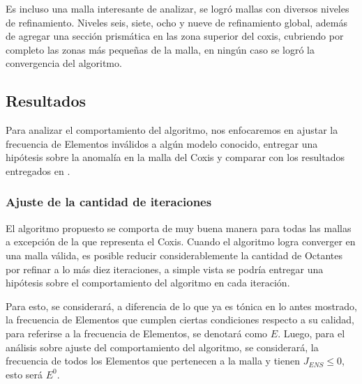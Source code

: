 Es incluso una malla interesante de analizar, se logró mallas con diversos niveles de refinamiento. Niveles seis, siete, ocho y nueve de refinamiento global, además de agregar una sección prismática en las zona superior del coxis, cubriendo por completo las zonas más pequeñas de la malla, en ningún caso se logró la convergencia del algoritmo.







\subsection{Resultados}

Para analizar el comportamiento del algoritmo, nos enfocaremos en ajustar la frecuencia de Elementos inválidos a algún modelo conocido, entregar una hipótesis sobre la anomalía en la malla del Coxis y comparar con los resultados entregados en \cite{daines2018repairing}.

\subsubsection{Ajuste de la cantidad de iteraciones}

El algoritmo propuesto se comporta de muy buena manera para todas las mallas a excepción de la que representa el Coxis.  Cuando el algoritmo logra converger en una malla válida, es posible reducir considerablemente la cantidad de Octantes por refinar a lo más diez iteraciones, a simple vista se podría entregar una hipótesis sobre el comportamiento del algoritmo en cada iteración.

Para esto, se considerará, a diferencia de lo que ya es tónica en lo antes mostrado, la frecuencia de Elementos que cumplen ciertas condiciones respecto a su calidad, para referirse a la frecuencia de Elementos, se denotará como $E$. Luego, para el análisis sobre ajuste del comportamiento del algoritmo, se considerará, la frecuencia de todos los Elementos que pertenecen a la malla y tienen $J_{ENS} \leq 0$, esto será $E^0$. 

